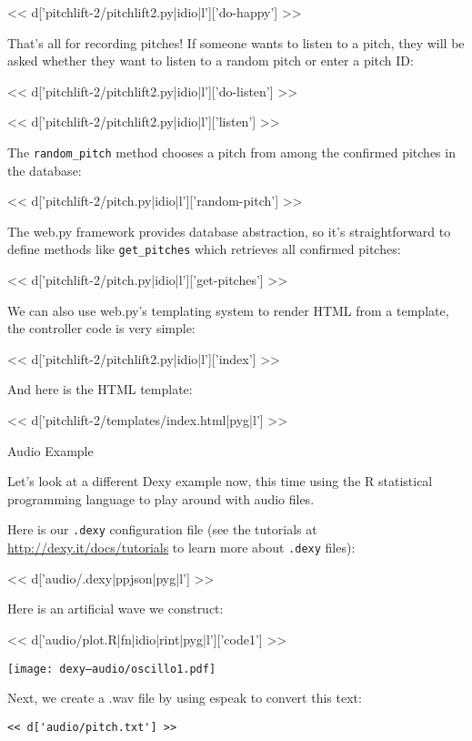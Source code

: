 \documentclass[custom, plainsections]{sciposter}
\begin{document}
\begin{multicols*}{2}
<< d['pitchlift-2/pitchlift2.py|idio|l']['do-happy'] >>

That's all for recording pitches! If someone wants to listen to a pitch, they will be asked whether they want to listen to a random pitch or enter a pitch ID:

<< d['pitchlift-2/pitchlift2.py|idio|l']['do-listen'] >>

<< d['pitchlift-2/pitchlift2.py|idio|l']['listen'] >>

The \verb|random_pitch| method chooses a pitch from among the confirmed pitches in the database:

<< d['pitchlift-2/pitch.py|idio|l']['random-pitch'] >>

The web.py framework provides database abstraction, so it's straightforward to define methods like \verb|get_pitches| which retrieves all confirmed pitches:

<< d['pitchlift-2/pitch.py|idio|l']['get-pitches'] >>

We can also use web.py's templating system to render HTML from a template, the controller code is very simple:

<< d['pitchlift-2/pitchlift2.py|idio|l']['index'] >>

And here is the HTML template:

<< d['pitchlift-2/templates/index.html|pyg|l'] >>

\pagebreak

\large
Audio Example
\small

\label{sec:audio-example}

\vspace{5pt}

Let's look at a different Dexy example now, this time using the R statistical programming language to play around with audio files.

Here is our \verb|.dexy| configuration file (see the tutorials at \href{http://bit.ly/zj8iAj}{http://dexy.it/docs/tutorials} to learn more about \verb|.dexy| files):

<< d['audio/.dexy|ppjson|pyg|l'] >>

Here is an artificial wave we construct:

<< d['audio/plot.R|fn|idio|rint|pyg|l']['code1'] >>

\texttt{[image: dexy--audio/oscillo1.pdf]}

Next, we create a .wav file by using espeak to convert this text:

\begin{Verbatim}
<< d['audio/pitch.txt'] >>
\end{Verbatim}


\end{multicols*}
\end{document}
